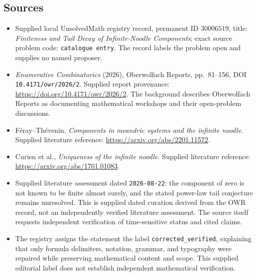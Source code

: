\documentclass[11pt]{article}
\begin{document}
\subsection{Sources}
\begin{itemize}
\item Supplied local UnsolvedMath registry record, permanent ID \(30006519\), title: \emph{Finiteness and Tail Decay of Infinite-Noodle Components}; exact source problem code: \texttt{catalogue entry}. The record labels the problem open and supplies no named proposer.
\item \emph{Enumerative Combinatorics} (2026), Oberwolfach Reports, pp.~81--156, DOI \texttt{10.4171/owr/2026/2}. Supplied report provenance: \url{https://doi.org/10.4171/owr/2026/2}. The background describes Oberwolfach Reports as documenting mathematical workshops and their open-problem discussions.
\item F\'eray--Th\'evenin, \emph{Components in meandric systems and the infinite noodle}. Supplied literature reference: \url{https://arxiv.org/abs/2201.11572}.
\item Curien et al., \emph{Uniqueness of the infinite noodle}. Supplied literature reference: \url{https://arxiv.org/abs/1701.01083}.
\item Supplied literature assessment dated \texttt{2026-08-22}: the component of zero is not known to be finite almost surely, and the stated power-law tail conjecture remains unresolved. This is supplied dated curation derived from the OWR record, not an independently verified literature assessment. The source itself requests independent verification of time-sensitive status and cited claims.
\item The registry assigns the statement the label \texttt{corrected\_verified}, explaining that only formula delimiters, notation, grammar, and typography were repaired while preserving mathematical content and scope. This supplied editorial label does not establish independent mathematical verification.
\end{itemize}
\end{document}
